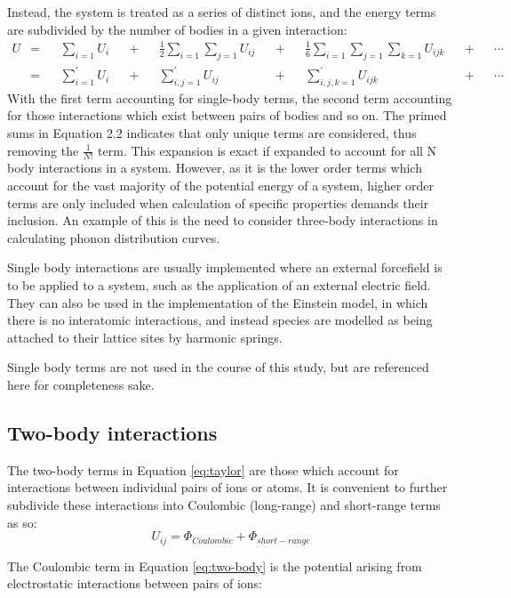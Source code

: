 Instead, the system is treated as a series of distinct ions, and the energy terms are subdivided by the number of bodies in a given interaction:\cite{Gale2003}
\begin{align}
U &=& &\sum_{i = 1} U_i&         &+& &\frac{1}{2}\sum_{i = 1} \sum_{j = 1} U_{ij}&  &+& &\frac{1}{6}\sum_{i = 1} \sum_{j = 1} \sum_{k = 1} U_{ijk}& &+& &\cdots\\
&=& &\sum_{i = 1}^\prime U_i&  &+& &\sum_{i,j = 1}^\prime U_{ij}&                 &+& &\sum_{i,j,k = 1}^\prime U_{ijk}&                           &+& &\cdots
\label{eq:taylor}
\end{align}
With the first term accounting for single-body terms, the second term accounting for those interactions which exist between pairs of bodies and so on.
The primed sums in Equation 2.2 indicates that only unique terms are considered, thus removing the $\frac{1}{N!}$ term.
This expansion is exact if expanded to account for all N body interactions in a system.
However, as it is the lower order terms which account for the vast majority of the potential energy of a system, higher order terms are only included when calculation of specific properties demands their inclusion. An example of this is the need to consider three-body interactions in calculating phonon distribution curves.

Single body interactions are usually implemented where an external forcefield is to be applied to a system, such as the application of an external electric field.
They can also be used in the implementation of the Einstein model, in which there is no interatomic interactions, and instead species are modelled as being attached to their lattice sites by harmonic springs.

Single body terms are not used in the course of this study, but are referenced here for completeness sake.

\newpage
\subsection{Two-body interactions}
The two-body terms in Equation \ref{eq:taylor} are those which account for interactions between individual pairs of ions or atoms. It is convenient to further subdivide these interactions into Coulombic (long-range) and short-range terms as so:
\begin{equation}
U_{ij} = \Phi_{Coulombic} + \Phi_{short-range}
\label{eq:two-body}
\end{equation}

The Coulombic term in Equation \ref{eq:two-body} is the potential arising from electrostatic interactions between pairs of ions:

